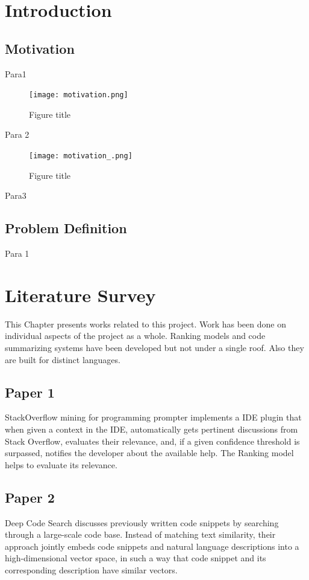 \documentclass[oneside,a4paper,12pt, times]{book}
\begin{document}
\setlength{\parindent}{11mm}
\chapter{Introduction}

\section{Motivation}
\-\hspace{0.5in}Para1
\begin{figure}[h]
    \centering
    \texttt{[image: motivation.png]}   
    \caption{Figure title}
    \label{fig:my_label}
\end{figure}

Para 2
\begin{figure}[h]
    \centering
    \texttt{[image: motivation\_.png]}   
    \caption{Figure title}
    \label{fig:my_label}
\end{figure}
  

Para3
\section{Problem Definition}
\label{sec:problem}
         Para 1

\chapter{Literature Survey}
This Chapter presents works related to this project. Work has been done on individual aspects of the project as a whole. Ranking models and code summarizing systems have been developed but not under a single roof. Also they are built for distinct languages. 
\section{Paper 1}
StackOverflow mining for programming prompter\cite{monperrus} implements a IDE plugin that when given a context in the IDE, automatically gets pertinent discussions from Stack Overflow, evaluates their relevance, and, if a given confidence threshold is surpassed, notifies the developer about the available help. The Ranking model helps to evaluate its relevance.
\section{Paper 2}
Deep Code Search\cite{gu2018deep} discusses previously written code snippets by searching through a large-scale code base. Instead of matching text similarity, their approach jointly embeds code snippets and natural language descriptions into a high-dimensional vector space, in such a way that code snippet and its corresponding description have similar vectors.
\end{document}
